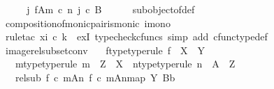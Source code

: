 \begin{isabellebody}
\ \ \isamarkupfalse%
\ \isamarkupfalse%
\ {\isachardoublequoteopen}{\isasymexists}j{\isachardot}{\kern0pt}\ {\isacharparenleft}{\kern0pt}f{\isasymlparr}A{\isasymrparr}\isactrlbsub m\ {\isasymcirc}\isactrlsub c\ n\isactrlesub {\isacharcomma}{\kern0pt}\ j{\isacharparenright}{\kern0pt}\ {\isasymsubseteq}\isactrlsub c\ B{\isachardoublequoteclose}\isanewline
\ \ \ \ \isamarkupfalse%
\ subobject{\isacharunderscore}{\kern0pt}of{\isacharunderscore}{\kern0pt}def\ \isamarkupfalse%
\ composition{\isacharunderscore}{\kern0pt}of{\isacharunderscore}{\kern0pt}monic{\isacharunderscore}{\kern0pt}pair{\isacharunderscore}{\kern0pt}is{\isacharunderscore}{\kern0pt}monic\ i{\isacharunderscore}{\kern0pt}mono\isanewline
\ \ \ \ \isamarkupfalse%
\ {\isacharparenleft}{\kern0pt}rule{\isacharunderscore}{\kern0pt}tac\ x{\isacharequal}{\kern0pt}{\isachardoublequoteopen}i\ {\isasymcirc}\isactrlsub c\ k{\isachardoublequoteclose}\ \ exI{\isacharcomma}{\kern0pt}\ typecheck{\isacharunderscore}{\kern0pt}cfuncs{\isacharcomma}{\kern0pt}\ simp\ add{\isacharcolon}{\kern0pt}\ cfunc{\isacharunderscore}{\kern0pt}type{\isacharunderscore}{\kern0pt}def{\isacharparenright}{\kern0pt}\isanewline
{}\isamarkupfalse%
%
\endisatagproof
{\isafoldproof}%
%
\isadelimproof
\isanewline
%
\endisadelimproof
\isanewline
{}\isamarkupfalse%
\ image{\isacharunderscore}{\kern0pt}rel{\isacharunderscore}{\kern0pt}subset{\isacharunderscore}{\kern0pt}conv{\isacharcolon}{\kern0pt}\isanewline
\ \ \ f{\isacharunderscore}{\kern0pt}type{\isacharbrackleft}{\kern0pt}type{\isacharunderscore}{\kern0pt}rule{\isacharbrackright}{\kern0pt}{\isacharcolon}{\kern0pt}\ {\isachardoublequoteopen}f\ {\isacharcolon}{\kern0pt}\ X\ {\isasymrightarrow}\ Y{\isachardoublequoteclose}\isanewline
\ \ \ m{\isacharunderscore}{\kern0pt}type{\isacharbrackleft}{\kern0pt}type{\isacharunderscore}{\kern0pt}rule{\isacharbrackright}{\kern0pt}{\isacharcolon}{\kern0pt}\ {\isachardoublequoteopen}m\ {\isacharcolon}{\kern0pt}\ Z\ {\isasymrightarrow}\ X{\isachardoublequoteclose}\ \ n{\isacharunderscore}{\kern0pt}type{\isacharbrackleft}{\kern0pt}type{\isacharunderscore}{\kern0pt}rule{\isacharbrackright}{\kern0pt}{\isacharcolon}{\kern0pt}\ {\isachardoublequoteopen}n\ {\isacharcolon}{\kern0pt}\ A\ {\isasymrightarrow}\ Z{\isachardoublequoteclose}\isanewline
\ \ \ rel{\isacharunderscore}{\kern0pt}sub{}{\isacharcolon}{\kern0pt}\ {\isachardoublequoteopen}{\isacharparenleft}{\kern0pt}{\isacharparenleft}{\kern0pt}f\ {\isasymcirc}\isactrlsub c\ m{\isacharparenright}{\kern0pt}{\isasymlparr}A{\isasymrparr}\isactrlbsub n\isactrlesub {\isacharcomma}{\kern0pt}\ {\isacharbrackleft}{\kern0pt}{\isacharparenleft}{\kern0pt}f\ {\isasymcirc}\isactrlsub c\ m{\isacharparenright}{\kern0pt}{\isasymlparr}A{\isasymrparr}\isactrlbsub n\isactrlesub {\isacharbrackright}{\kern0pt}map{\isacharparenright}{\kern0pt}\ {\isasymsubseteq}\isactrlbsub Y\isactrlesub \ {\isacharparenleft}{\kern0pt}B{\isacharcomma}{\kern0pt}b{\isacharparenright}{\kern0pt}{\isachardoublequoteclose}\isanewline

\end{isabellebody}
